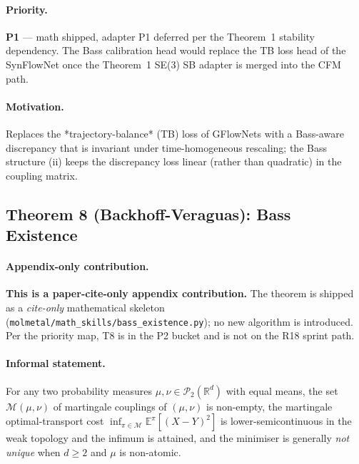 \paragraph{Priority.}
\textbf{P1} --- math shipped, adapter P1 deferred per the Theorem~1
stability dependency.  The Bass calibration head would replace the
TB loss head of the SynFlowNet once the Theorem~1 SE(3) SB adapter
is merged into the CFM path.

\paragraph{Motivation.}
Replaces the *trajectory-balance* (TB) loss of GFlowNets with a
Bass-aware discrepancy that is invariant under time-homogeneous
rescaling; the Bass structure (ii) keeps the discrepancy loss
linear (rather than quadratic) in the coupling matrix.

\subsection{Theorem 8 (Backhoff-Veraguas): Bass Existence}
\label{sec:math:T8}

\paragraph{Appendix-only contribution.}
\textbf{This is a paper-cite-only appendix contribution.}  The
theorem is shipped as a \emph{cite-only} mathematical skeleton
(\texttt{molmetal/math\_skills/bass\_existence.py}); no new
algorithm is introduced.  Per the priority map, T8 is in the P2
bucket and is not on the R18 sprint path.

\paragraph{Informal statement.}
For any two probability measures $\mu, \nu \in
\mathcal{P}_2(\mathbb{R}^d)$ with equal means, the set
$\mathcal{M}(\mu, \nu)$ of martingale couplings of $(\mu, \nu)$ is
non-empty, the martingale optimal-transport cost
$\inf_{\pi \in \mathcal{M}} \mathbb{E}^{\pi}[(X - Y)^2]$ is
lower-semicontinuous in the weak topology and the infimum is
attained, and the minimiser is generally \emph{not unique} when
$d \ge 2$ and $\mu$ is non-atomic.


